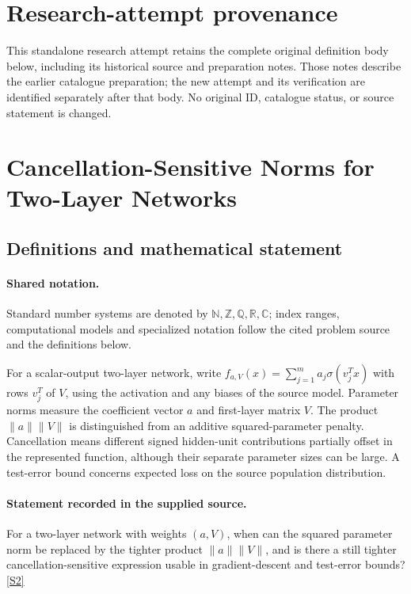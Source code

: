 \documentclass[11pt]{article}
\begin{document}
\section*{Research-attempt provenance}
This standalone research attempt retains the complete original definition body below,
including its historical source and preparation notes. Those notes describe the
earlier catalogue preparation; the new attempt and its verification are identified
separately after that body. No original ID, catalogue status, or source statement is changed.

\section{Cancellation-Sensitive Norms for Two-Layer Networks}\label{statement}

\subsection{Definitions and mathematical statement}

\paragraph{Shared notation.}Standard number systems are denoted by $\mathbb N,\mathbb Z,\mathbb Q,\mathbb R,\mathbb C$; index ranges, computational models and specialized notation follow the cited problem source and the definitions below.


For a scalar-output two-layer network, write $f_{a,V}(x)=\sum_{j=1}^m a_j\sigma(v_j^Tx)$ with rows $v_j^T$ of $V$, using the activation and any biases of the source model. Parameter norms measure the coefficient vector $a$ and first-layer matrix $V$. The product $\lVert a\rVert\lVert V\rVert$ is distinguished from an additive squared-parameter penalty. Cancellation means different signed hidden-unit contributions partially offset in the represented function, although their separate parameter sizes can be large. A test-error bound concerns expected loss on the source population distribution.
\paragraph{Statement recorded in the supplied source.}
For a two-layer network with weights $(a,V)$, when can the squared parameter norm be replaced by the tighter product $\lVert a\rVert\lVert V\rVert$, and is there a still tighter cancellation-sensitive expression usable in gradient-descent and test-error bounds? \href{https://doi.org/10.4171/owr/2022/46}{[S2]}
\end{document}
